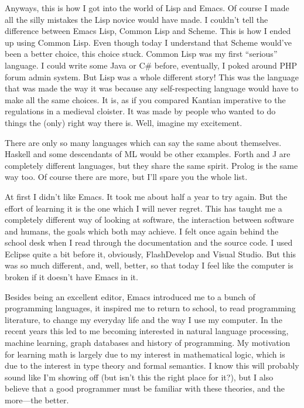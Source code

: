 \documentclass[oneside]{memoir}
\begin{document}
Anyways, this is how I got into the world of Lisp and Emacs.  Of course I made
all the silly mistakes the Lisp novice would have made.  I couldn't tell the
difference between Emacs Lisp, Common Lisp and Scheme.  This is how I ended up
using Common Lisp.  Even though today I understand that Scheme would've been a
better choice, this choice stuck.  Common Lisp was my first ``serious''
language.  I could write some Java or C\# before, eventually, I poked around
PHP forum admin system.  But Lisp was a whole different story!  This was the
language that was made the way it was because any self-respecting language
would have to make all the same choices.  It is, as if you compared Kantian
imperative to the regulations in a medieval cloister.  It was made by people
who wanted to do things the (only) right way there is.  Well, imagine my
excitement.

There are only so many languages which can say the same about themselves.
Haskell and some descendants of ML would be other examples. Forth and J are
completely different languages, but they share the same spirit.  Prolog is the
same way too.  Of course there are more, but I'll spare you the whole list.

At first I didn't like Emacs.  It took me about half a year to try again.  But
the effort of learning it is the one which I will never regret.  This has
taught me a completely different way of looking at software, the interaction
between software and humans, the goals which both may achieve.  I felt once
again behind the school desk when I read through the documentation and the
source code.  I used Eclipse quite a bit before it, obviously, FlashDevelop
and Visual Studio.  But this was so much different, and, well, better, so that
today I feel like the computer is broken if it doesn't have Emacs in it.

Besides being an excellent editor, Emacs introduced me to a bunch of
programming languages, it inspired me to return to school, to read programming
literature, to change my everyday life and the way I use my computer.  In the
recent years this led to me becoming interested in natural language
processing, machine learning, graph databases and history of programming.  My
motivation for learning math is largely due to my interest in mathematical
logic, which is due to the interest in type theory and formal semantics.  I
know this will probably sound like I'm showing off (but isn't this the right
place for it?), but I also believe that a good programmer must be familiar
with these theories, and the more---the better.
\end{document}
